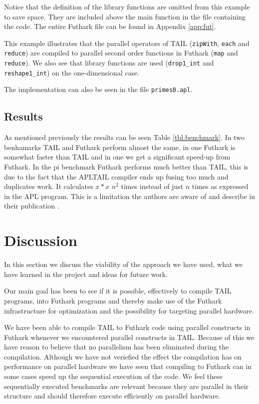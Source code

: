 \documentclass[11pt]{article}
\begin{document}
Notice that the definition of the library functions are omitted from this example to save space.
They are included above the main function in the file containing the code. The entire Futhark file can be found in Appendix \ref{app:fut}.

This example illustrates that the parallel operators of TAIL ({\tt zipWith}, {\tt each} and {\tt reduce}) are compiled to parallel  second order functions in Futhark ({\tt map} and {\tt reduce}). 
We also see that library functions are used ({\tt drop1\_int} and {\tt reshape1\_int}) on the one-dimensional case.

The implementation can also be seen in the file {\tt primes0.apl}.

\subsection{Results}
As mentioned previously the results can be seen Table \ref{tbl:benchmark}.
In two benhamarks TAIL and Futhark perform almost the same, in one Futhark is somewhat faster than TAIL and in one we get
a significant speed-up from Futhark.
In the pi benchmark Futhark performs much better than TAIL, this is due to the fact that the APLTAIL compiler ends up fusing too much and duplicates work.
It calculates $x * x$ $n^2$ times instead of just $n$ times as expressed in the APL program.
This is a limitation the authors are aware of and describe in their publication \cite{Array:2015}.

\section{Discussion}
\label{sec:discussion}
In this section we discuss the viability of the approach we have used, what we have learned in the project and ideas for future work. 

Our main goal has been to see if it is possible, effectively to compile TAIL programs, into Futhark programs and thereby make use of the Futhark infrastructure for optimization and the possibility for targeting parallel hardware.

We have been able to compile TAIL to Futhark code using parallel constructs in Futhark whenever we encountered parallel constructs in TAIL.
Because of this we have reason to believe that no parallelism has been eliminated during the compilation.
Although we have not veriefied the effect the compilation has on performance on parallel hardware we have seen
that compiling to Futhark can in some cases speed up the sequential execution of the code.
We feel these sequentially executed benchmarks are relevant because they are parallel in their structure and should therefore execute efficiently on parallel
 hardware.
 
\end{document}
